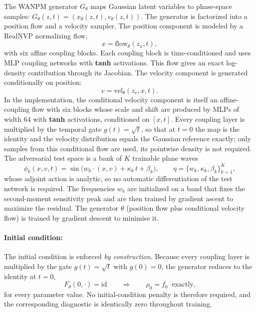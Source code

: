 \documentclass[11pt]{article}
\theoremstyle{plain}
\begin{document}
The WANPM generator \(G_\theta\) maps Gaussian latent variables to phase-space samples:  $G_\theta(z,t)=(x_\theta(z,t),v_\theta(z,t)).$ The generator is factorized into a position flow and a velocity sampler. The position component is modeled by a RealNVP normalizing flow,
$$
x=\mathrm{flow}_{\theta}(z_x,t),
$$
with six affine coupling blocks. Each coupling block is time-conditioned and uses MLP coupling networks with \textbf{tanh} activations. This flow gives an exact log-density contribution through its Jacobian. The velocity component is generated conditionally on position:
$$
v=\mathrm{vel}_\theta(z_v,x,t).
$$
In the implementation, the conditional velocity component is itself an affine-coupling flow with six blocks whose
scale and shift are produced by MLPs of width $64$ with \textbf{tanh} activations, conditioned on $[x,t]$. Every
coupling layer is multiplied by the temporal gate $g(t)=\sqrt t$, so that at $t=0$ the map is the identity and the
velocity distribution equals the Gaussian reference exactly; only samples from this conditional flow are used, its
pointwise density is not required. The adversarial test space is a bank of $K$ trainable plane waves
\[
\phi_k(x,v,t)=\sin\!\big(w_k\cdot(x,v)+\kappa_k\,t+\beta_k\big),\qquad \eta=\{w_k,\kappa_k,\beta_k\}_{k=1}^{K},
\]
whose adjoint action is analytic, so no automatic differentiation of the test network is required. The frequencies
$w_k$ are initialized on a band that fixes the second-moment sensitivity peak and are then trained by gradient ascent to maximize the residual. The generator $\theta$ (position flow plus conditional velocity flow) is trained by gradient descent to minimise it.

\paragraph{Initial condition:}

The initial condition is enforced \emph{by construction}. Because every coupling layer is multiplied by the gate
$g(t)=\sqrt t$ with $g(0)=0$, the generator reduces to the identity at $t=0$,
$$
F_\theta(0,\cdot)=\mathrm{id}\qquad\Longrightarrow\qquad \rho_0=f_0\ \text{ exactly,}
$$
for every parameter value. No initial-condition penalty is therefore required, and the corresponding diagnostic is
identically zero throughout training.

\end{document}
